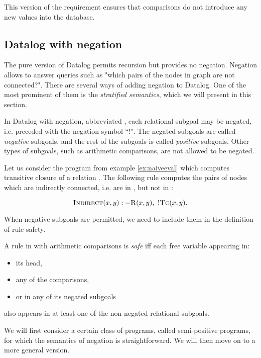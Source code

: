 This version of the requirement ensures that comparisons do not introduce any new values into the database.

\subsection{Datalog with negation}\label{ss:datalogneg}
The pure version of Datalog permits recursion but provides no negation. Negation allows to answer queries such as "which pairs of the nodes in graph are not connected?". There are several ways of adding negation to Datalog. One of the most prominent of them is the \emph{stratified semantics}, which we will present in this section. 

In Datalog with negation, abbreviated \datalogneg, each relational subgoal may be negated, i.e. preceded with the negation symbol ``$!$". The negated subgoals are called \emph{negative} subgoals, and the rest of the subgoals is called \emph{positive} subgoals. Other types of subgoals, such as arithmetic comparisons, are not allowed to be negated.

\begin{exmp}
Let us consider the program from example \ref{ex:naiveeval} which computes transitive closure  of a relation . The following rule computes the pairs of nodes which are indirectly connected, i.e. are in , but not in :

$$\textsc{Indirect}(x, y) :- \textsc{R}(x, y),~!\textsc{Tc}(x, y).$$
\end{exmp}

When negative subgoals are permitted, we need to include them in the definition of rule safety.

\begin{defn}\label{d:datalognegsaferule}
A rule in \datalogneg with arithmetic comparisons is \emph{safe} iff each free variable appearing in:
\begin{itemize}
\item its head,
\item any of the comparisons,
\item or in any of its negated subgoals
\end{itemize}
also appears in at least one of the non-negated relational subgoals.
\end{defn}

We will first consider a certain class of \datalogneg programs, called semi-positive programs, for which the semantics of negation is straightforward. We will then move on to a more general version.

